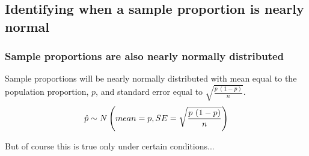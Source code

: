 \documentclass[notes,11pt, aspectratio=169]{beamer}
\begin{document}
\subsection{Identifying when a sample proportion is nearly normal}


\begin{frame}
\frametitle{Sample proportions are also nearly normally distributed}

{
Sample proportions will be nearly normally distributed with mean equal to the population proportion, $p$, and standard error equal to $\sqrt{\frac{p~(1-p)}{n}}$.
\[ \hat{p} \sim N \left(  mean = p, SE = \sqrt{\frac{p~(1-p)}{n}}  \right) \]
}

But of course this is true only under certain conditions...



\pause


\end{frame}


%
%
%
%
\end{document}
